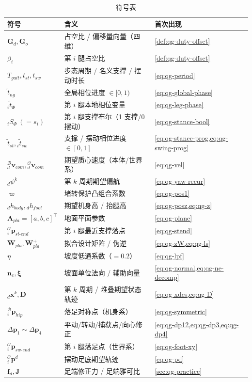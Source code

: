\begin{table}[H]\centering\small
\caption{符号表}
\begin{tabular}{lll}
\toprule
符号 & 含义 & 首次出现 \\
\midrule
$\mathbf{G}_d,\mathbf{G}_o$ & 占空比 / 偏移量向量（四维） & \cref{def:qg-duty-offset} \\
$\beta_i$ & 第 $i$ 腿占空比 & \cref{def:qg-duty-offset} \\
$T_{gait},t_{st},t_{sw}$ & 步态周期 / 名义支撑 / 摆动时长 & \cref{eq:qg-period} \\
$\tilde t_{ng}$ & 全局相位进度 $\in[0,1)$ & \cref{eq:qg-global-phase} \\
${}_i\tilde t_\Phi$ & 第 $i$ 腿本地相位变量 & \cref{eq:qg-leg-phase} \\
${}_iS_\Phi\ (=s_i)$ & 第 $i$ 腿支撑布尔（1 支撑/0 摆动） & \cref{eq:qg-stance-bool} \\
$\tilde t_{st},{}_i\tilde t_{sw}$ & 支撑 / 摆动相位进度 $\in[0,1]$ & \cref{eq:qg-stance-prog,eq:qg-swing-prog} \\
${}_d^{\mathcal{B}}\boldsymbol{v}_{com},{}_d^{\mathcal{O}}\boldsymbol{v}_{com}$ & 期望质心速度（本体/世界系） & \cref{eq:qg-vel} \\
${}_d\psi^k$ & 第 $k$ 周期期望偏航 & \cref{eq:qg-yaw-recur} \\
$\varpi$ & 堵转保护凸组合系数 & \cref{eq:qg-pos1} \\
${}_dh_{body},{}_dh_{foot}$ & 期望机身高 / 抬腿高 & \cref{eq:qg-posz,eq:qg-z} \\
$\mathbf{A}_{pla}=[a,b,c]^\top$ & 地面平面参数 & \cref{eq:qg-plane} \\
${}_i^{\mathcal{O}}\boldsymbol{p}_{st\text{-}end}$ & 第 $i$ 腿最近支撑落点 & \cref{eq:qg-stend} \\
$\mathbf{W}_{pla},\mathbf{W}_{pla}^{+}$ & 拟合设计矩阵 / 伪逆 & \cref{eq:qg-zW,eq:qg-ls} \\
$\eta$ & 坡度低通系数（$=0.2$） & \cref{eq:qg-lpf} \\
$\boldsymbol{n}_e,\boldsymbol{\xi}$ & 坡面单位法向 / 辅助向量 & \cref{eq:qg-normal,eq:qg-ne-decomp} \\
${}_d\boldsymbol{x}^k,\mathbf{D}$ & 第 $k$ 周期 / 堆叠期望状态轨迹 & \cref{eq:qg-xdes,eq:qg-D} \\
${}_i^{\mathcal{B}}\boldsymbol{p}_{hip}$ & 落足对称点（机身系） & \cref{eq:qg-symmetric} \\
$\Delta\boldsymbol{p}_1\!\sim\!\Delta\boldsymbol{p}_4$ & 平动/转动/捕获点/向心修正 & \cref{eq:qg-dp12,eq:qg-dp3,eq:qg-dp4} \\
${}_i^{\mathcal{O}}\boldsymbol{p}_{sw\text{-}end}$ & 第 $i$ 腿落足点（世界系） & \cref{eq:qg-foot-xy} \\
${}_i^{\mathcal{O}}\boldsymbol{p}^{d}$ & 摆动足底期望轨迹 & \cref{eq:qg-pd} \\
$\boldsymbol{f}_d,\mathbf{J}$ & 足端修正力 / 足端雅可比 & \cref{sec:qg-practice} \\
\bottomrule
\end{tabular}
\end{table}

